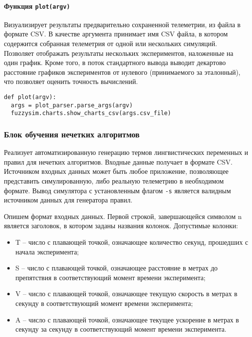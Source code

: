 \paragraph{ Функция \lstinline!plot(argv)!}

Визуализирует результаты предварительно сохраненной телеметрии, из файла в формате CSV. В качестве аргумента принимает имя CSV файла, в котором содержится собранная телеметрия от одной или нескольких симуляций. Позволяет отображать результаты нескольких экспериментов, наложенные на один график. Кроме того, в поток стандартного вывода выводит декартово расстояние графиков экспериментов от нулевого (принимаемого за эталонный), что позволяет оценить точность вычислений.

\begin{lstlisting}[style=pythonstyle,caption={  }, label=lst:func:1]
def plot(argv):
  args = plot_parser.parse_args(argv)
  fuzzysim.charts.show_charts_csv(args.csv_file)
\end{lstlisting}


\subsubsection{Блок обучения нечетких алгоритмов }

Реализует автоматизированную генерацию термов лингвистических переменных и правил для нечетких алгоритмов. Входные данные получает в формате CSV. Источником входных данных может быть любое приложение, позволяющее представить симулированную, либо реальную телеметрию в необходимом формате. Вывод симулятора с установленным флагом \lstinline!-s! является валидным источником данных для генератора правил.

Опишем формат входных данных. Первой строкой, завершающейся символом n является заголовок, в котором заданы названия колонок. Допустимые колонки:

\begin{itemize}
\item T – число с плавающей точкой, означающее количество секунд, прошедших с начала эксперимента;
\item S – число с плавающей точкой, означающее расстояние в метрах до препятствия в соответствующий момент времени эксперимента;
\item V – число с плавающей точкой, означающее текущую скорость в метрах в секунду в соответствующий момент времени эксперимента;
\item A – число с плавающей точкой, означающее текущее ускорение в метрах в секунду за секунду в соответствующий момент времени эксперимента.
\end{itemize}

